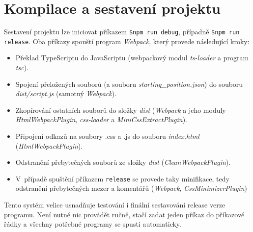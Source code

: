 \documentclass[a4paper,12pt]{article}
\begin{document}
	\section{Kompilace a sestavení projektu}
	Sestavení projektu lze iniciovat příkazem \verb|$npm run debug|, případně \verb|$npm run release|. Oba příkazy
	spouští program \textit{Webpack}, který provede následující kroky:
	\begin{itemize}
		\item Překlad TypeScriptu do JavaScriptu (webpackový modul \textit{ts-loader} a program \textit{tsc}).
		\item Spojení přeložených souborů (a souboru \textit{starting\_position.json}) do souboru 
		      \textit{dist/script.js} (samotný \textit{Webpack}).
		\item Zkopírování ostatních souborů do složky \textit{dist} (\textit{Webpack} a jeho moduly
		      \textit{HtmlWebpackPlugin}, \textit{css-loader} a \textit{MiniCssExtractPlugin}).
		\item Připojení odkazů na soubory .css a .js do souboru \textit{index.html} (\textit{HtmlWebpackPlugin}).
		\item Odstranění přebytečných souborů ze složky \textit{dist} (\textit{CleanWebpackPlugin}).
		\item V~případě spuštění příkazem \texttt{release} se provede taky minifikace, tedy odstranění
		      přebytečných mezer a komentářů (\textit{Webpack}, \textit{CssMinimizerPlugin})
	\end{itemize}

	Tento systém velice usnadňuje testování i finální sestavování release verze programu. Není nutné nic
	provádět ručně, stačí zadat jeden příkaz do příkazové řádky a všechny potřebné programy se spustí
	automaticky.
	
\end{document}
